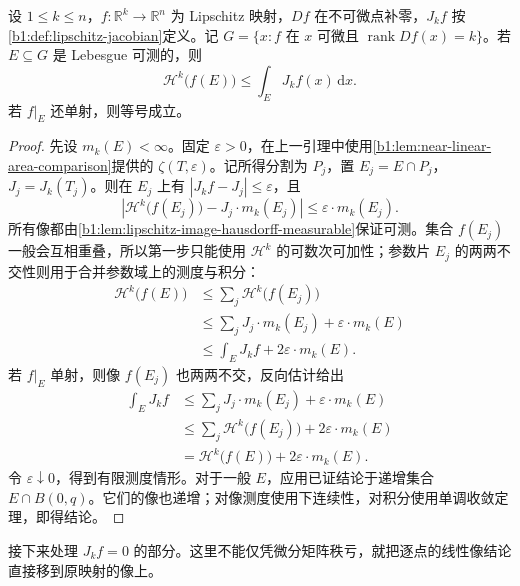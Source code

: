 \begin{lemma}\label{b1:lem:full-rank-area-comparison}
设 \(1\le k\le n\)，\(f:\mathbb R^k\to\mathbb R^n\) 为 Lipschitz 映射，\(Df\) 在不可微点补零，\(J_kf\) 按\cref{b1:def:lipschitz-jacobian}定义。记 \(G=\{x:f\text{ 在 }x\text{ 可微且 }\operatorname{rank}Df(x)=k\}\)。若 \(E\subseteq G\) 是 Lebesgue 可测的，则
\[
 \mathcal H^k\bigl(f(E)\bigr)\leq\int_EJ_kf(x)\,\mathrm dx.
\]
若 \(f|_E\) 还单射，则等号成立。
\end{lemma}
\begin{proof}
先设 \(m_k(E)<\infty\)。固定 \(\varepsilon>0\)，在上一引理中使用\cref{b1:lem:near-linear-area-comparison}提供的 \(\zeta(T,\varepsilon)\)。记所得分割为 \(P_j\)，置 \(E_j=E\cap P_j\)，\(J_j=J_k(T_j)\)。则在 \(E_j\) 上有 \(|J_kf-J_j|\leq\varepsilon\)，且
\[
 \left|\mathcal H^k\bigl(f(E_j)\bigr)-J_j\cdot m_k(E_j)\right|
 \leq\varepsilon\cdot m_k(E_j).
\]
所有像都由\cref{b1:lem:lipschitz-image-hausdorff-measurable}保证可测。集合 \(f(E_j)\) 一般会互相重叠，所以第一步只能使用 \(\mathcal H^k\) 的可数次可加性；参数片 \(E_j\) 的两两不交性则用于合并参数域上的测度与积分：
\[
 \begin{aligned}
 \mathcal H^k\bigl(f(E)\bigr)
 &\leq\sum_j\mathcal H^k\bigl(f(E_j)\bigr)\\
 &\leq\sum_jJ_j\cdot m_k(E_j)+\varepsilon\cdot m_k(E)\\
 &\leq\int_EJ_kf+2\varepsilon\cdot m_k(E).
 \end{aligned}
\]
若 \(f|_E\) 单射，则像 \(f(E_j)\) 也两两不交，反向估计给出
\[
 \begin{aligned}
 \int_EJ_kf
 &\leq\sum_jJ_j\cdot m_k(E_j)+\varepsilon\cdot m_k(E)\\
 &\leq\sum_j\mathcal H^k\bigl(f(E_j)\bigr)+2\varepsilon\cdot m_k(E)\\
 &=\mathcal H^k\bigl(f(E)\bigr)+2\varepsilon\cdot m_k(E).
 \end{aligned}
\]
令 \(\varepsilon\downarrow0\)，得到有限测度情形。对于一般 \(E\)，应用已证结论于递增集合 \(E\cap B(0,q)\)。它们的像也递增；对像测度使用下连续性，对积分使用单调收敛定理，即得结论。
\end{proof}

接下来处理 \(J_kf=0\) 的部分。这里不能仅凭微分矩阵秩亏，就把逐点的线性像结论直接移到原映射的像上。

